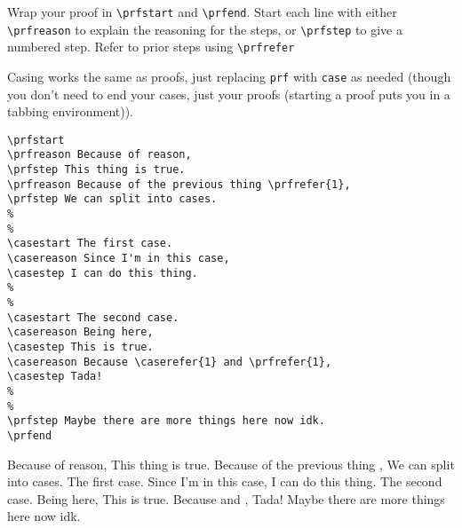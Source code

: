 \documentclass{article}
\begin{document}
Wrap your proof in \verb|\prfstart| and \verb|\prfend|. Start each line with either \verb|\prfreason| to explain the reasoning for the steps, or \verb|\prfstep| to give a numbered step. Refer to prior steps using \verb|\prfrefer|

Casing works the same as proofs, just replacing \verb|prf| with \verb|case| as needed (though you don't need to end your cases, just your proofs (starting a proof puts you in a tabbing environment)).

\begin{verbatim}
\prfstart
\prfreason Because of reason,
\prfstep This thing is true.
\prfreason Because of the previous thing \prfrefer{1},
\prfstep We can split into cases.
%
%
\casestart The first case.
\casereason Since I'm in this case,
\casestep I can do this thing.
%
%
\casestart The second case.
\casereason Being here,
\casestep This is true.
\casereason Because \caserefer{1} and \prfrefer{1},
\casestep Tada!
%
%
\prfstep Maybe there are more things here now idk.
\prfend
\end{verbatim}

\prfstart
\prfreason Because of reason,
\prfstep This thing is true.
\prfreason Because of the previous thing ,
\prfstep We can split into cases.
%
%
\casestart The first case.
\casereason Since I'm in this case,
\casestep I can do this thing.
%
%
\casestart The second case.
\casereason Being here,
\casestep This is true.
\casereason Because  and ,
\casestep Tada!
%
%
\prfstep Maybe there are more things here now idk.
\prfend
\end{document}
